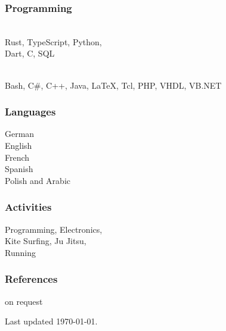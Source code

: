 \begin{facts}
    \subsubsection{Programming}
    \\
    Rust, TypeScript, Python,\\
    Dart, C, SQL
    \sectionsep
    
    \\
    Bash, C\#, C++, Java, LaTeX, Tcl, PHP, VHDL, VB.NET
    \sectionsep
    
    \subsubsection{Languages}
    German \\
    English \\
    French \\
    Spanish \\
    Polish and Arabic 
    \sectionsep
    
    \subsubsection{Activities}
    Programming, Electronics,\\
    Kite Surfing, Ju Jitsu, \\
    Running
    \sectionsep
    
    \subsubsection{References}
    on request
    
    \sectionsep
    Last updated \today.
    
    \end{facts}%
